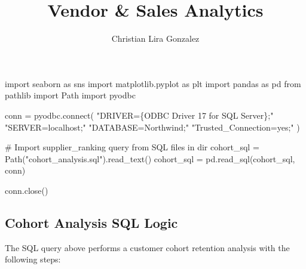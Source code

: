 \documentclass[
  letterpaper,
  DIV=11,
  numbers=noendperiod]{scrartcl}
\title{Vendor \& Sales Analytics}
\author{Christian Lira Gonzalez}
\date{}
\newenvironment{Shaded}{\begin{snugshade}}{\end{snugshade}}
\newcommand{\CommentTok}[1]{\textcolor[rgb]{0.37,0.37,0.37}{#1}}
\newcommand{\ExtensionTok}[1]{\textcolor[rgb]{0.00,0.23,0.31}{#1}}
\newcommand{\ImportTok}[1]{\textcolor[rgb]{0.00,0.46,0.62}{#1}}
\newcommand{\NormalTok}[1]{\textcolor[rgb]{0.00,0.23,0.31}{#1}}
\newcommand{\OperatorTok}[1]{\textcolor[rgb]{0.37,0.37,0.37}{#1}}
\newcommand{\StringTok}[1]{\textcolor[rgb]{0.13,0.47,0.30}{#1}}
\begin{document}
\maketitle


\begin{Shaded}
\begin{Highlighting}[]
\ImportTok{import}\NormalTok{ seaborn }\ImportTok{as}\NormalTok{ sns}
\ImportTok{import}\NormalTok{ matplotlib.pyplot }\ImportTok{as}\NormalTok{ plt}
\ImportTok{import}\NormalTok{ pandas }\ImportTok{as}\NormalTok{ pd}
\ImportTok{from}\NormalTok{ pathlib }\ImportTok{import}\NormalTok{ Path}
\ImportTok{import}\NormalTok{ pyodbc}
\end{Highlighting}
\end{Shaded}

\begin{Shaded}
\begin{Highlighting}[]
\NormalTok{conn }\OperatorTok{=}\NormalTok{ pyodbc.}\ExtensionTok{connect}\NormalTok{(}
    \StringTok{"DRIVER=\{ODBC Driver 17 for SQL Server\};"}
    \StringTok{"SERVER=localhost;"}
    \StringTok{"DATABASE=Northwind;"}
    \StringTok{"Trusted\_Connection=yes;"}
\NormalTok{)}

\CommentTok{\# Import supplier\_ranking query from SQL files in dir}
\NormalTok{cohort\_sql }\OperatorTok{=}\NormalTok{ Path(}\StringTok{"cohort\_analysis.sql"}\NormalTok{).read\_text()}
\NormalTok{cohort\_sql }\OperatorTok{=}\NormalTok{ pd.read\_sql(cohort\_sql, conn)}

\NormalTok{conn.close()}
\end{Highlighting}
\end{Shaded}

\subsection{Cohort Analysis SQL Logic}\label{cohort-analysis-sql-logic}

The SQL query above performs a customer cohort retention analysis with
the following steps:
\end{document}
